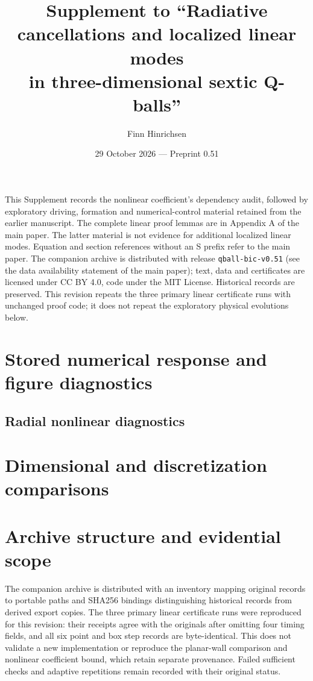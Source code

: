 \documentclass[a4paper,11pt]{article}
\title{Supplement to ``Radiative cancellations and localized linear modes\\in three-dimensional sextic Q-balls''}
\author{Finn Hinrichsen}
\date{29 October 2026 --- Preprint 0.51}
\begin{document}
\maketitle
This Supplement records the nonlinear coefficient's dependency audit,
followed by exploratory driving, formation and numerical-control
material retained from the earlier manuscript. The complete linear
proof lemmas are in Appendix A of the main paper.
The latter material is not evidence for additional localized linear modes.
Equation and section references without an S prefix refer to the main paper.
The companion archive is distributed with release \texttt{qball-bic-v0.51}
(see the data availability statement of the main paper); text, data and
certificates are licensed under CC BY 4.0, code under the MIT License.
Historical records are preserved. This revision
repeats the three primary linear certificate runs with unchanged proof
code; it does not repeat the exploratory physical evolutions below.
\tableofcontents

\section{Stored numerical response and figure diagnostics}

\subsection{Radial nonlinear diagnostics}\label{supp:c0-evidence}


\section{Dimensional and discretization comparisons}



\clearpage

\clearpage

\clearpage

\section{Archive structure and evidential scope}\label{app:provenance}
The companion archive is distributed with an inventory mapping
original records to portable paths and SHA256 bindings distinguishing
historical records from derived export copies. The three primary linear
certificate runs were reproduced for this revision: their receipts agree
with the originals after omitting four timing fields, and all six point
and box step records are byte-identical. This does not validate a new
implementation or reproduce the planar-wall comparison and nonlinear
coefficient bound, which retain separate provenance. Failed sufficient
checks and adaptive repetitions remain recorded with their original status.

\end{document}
